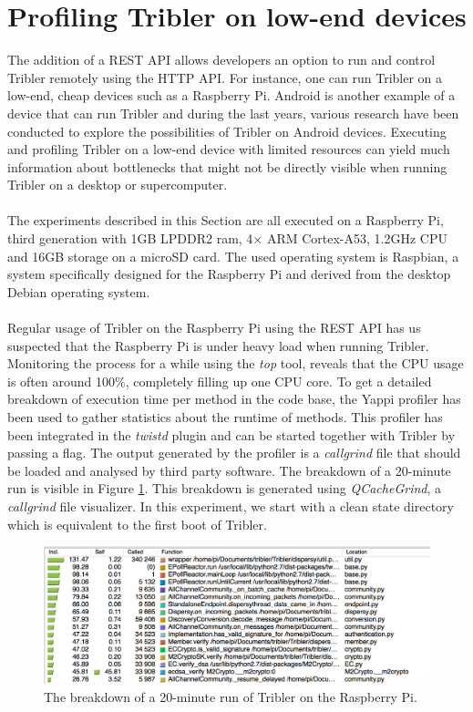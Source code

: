 \section{Profiling Tribler on low-end devices}
The addition of a REST API allows developers an option to run and control Tribler remotely using the HTTP API. For instance, one can run Tribler on a low-end, cheap devices such as a Raspberry Pi. Android is another example of a device that can run Tribler and during the last years, various research have been conducted to explore the possibilities of Tribler on Android devices\cite{sabee2014tribler}\cite{de2014android}. Executing and profiling Tribler on a low-end device with limited resources can yield much information about bottlenecks that might not be directly visible when running Tribler on a desktop or supercomputer.\\\\
The experiments described in this Section are all executed on a Raspberry Pi, third generation with 1GB LPDDR2 ram, 4× ARM Cortex-A53, 1.2GHz CPU and 16GB storage on a microSD card. The used operating system is Raspbian, a system specifically designed for the Raspberry Pi and derived from the desktop Debian operating system.\\\\
Regular usage of Tribler on the Raspberry Pi using the REST API has us suspected that the Raspberry Pi is under heavy load when running Tribler. Monitoring the process for a while using the \emph{top} tool, reveals that the CPU usage is often around 100\%, completely filling up one CPU core. To get a detailed breakdown of execution time per method in the code base, the Yappi profiler has been used to gather statistics about the runtime of methods. This profiler has been integrated in the \emph{twistd} plugin and can be started together with Tribler by passing a flag. The output generated by the profiler is a \emph{callgrind} file that should be loaded and analysed by third party software. The breakdown of a 20-minute run is visible in Figure \ref{fig:yappi_breakdown}. This breakdown is generated using \emph{QCacheGrind}, a \emph{callgrind} file visualizer. In this experiment, we start with a clean state directory which is equivalent to the first boot of Tribler.

\begin{figure}[!h]
	\centering
	\includegraphics[width=0.9\columnwidth]{images/experiments/yappi_breakdown}
	\caption{The breakdown of a 20-minute run of Tribler on the Raspberry Pi.}
	\label{fig:yappi_breakdown}
\end{figure}


